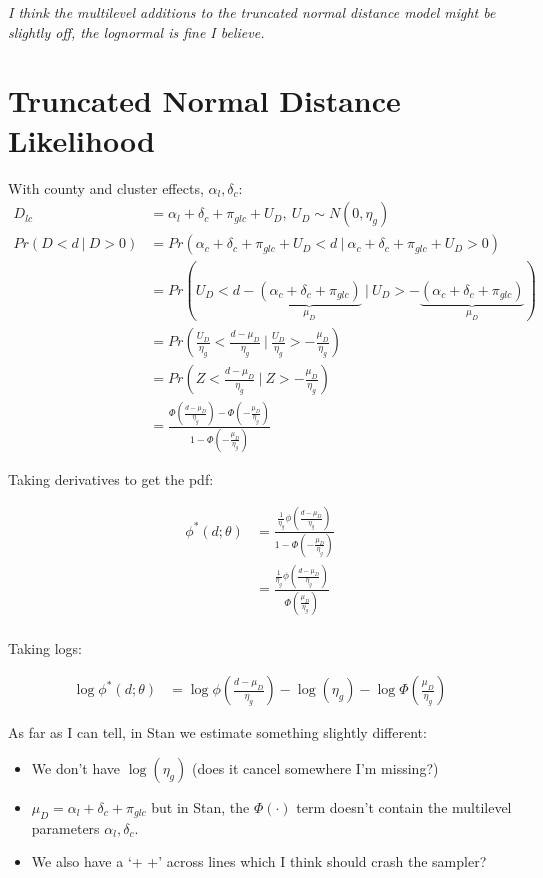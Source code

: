 \documentclass{article}
\begin{document}
    
\textit{I think the multilevel additions to the truncated normal distance model 
might be slightly off, 
the lognormal is fine I believe.}
\section*{Truncated Normal Distance Likelihood}

With county and cluster effects, $\alpha_l, \delta_c$:
\begin{align*}
  D_{lc} &= \alpha_l + \delta_c + \pi_{glc} + U_D, \ U_D \sim N(0, \eta_g) \\
  Pr(D < d \ |\  D > 0 ) &= Pr(\alpha_c + \delta_c + \pi_{glc} + U_D < d \ | \ 
  \alpha_c + \delta_c + \pi_{glc} + U_D > 0) \\
   &= Pr( U_D < d -  \underbrace{(\alpha_c + \delta_c + \pi_{glc})}_{\mu_D}\   |\  
    U_D > - \underbrace{(\alpha_c + \delta_c + \pi_{glc})}_{\mu_D}) \\ 
   &= Pr\left( \frac{U_D}{\eta_g} <  \frac{d - \mu_D}{\eta_g} \   |\  
    \frac{U_D}{\eta_g} > - \frac{\mu_D}{\eta_g}\right) \\  
    &= Pr(Z < \frac{d - \mu_D}{\eta_g} \ |\  Z > -\frac{\mu_D}{\eta_g} ) \\
    &= \frac{
      \Phi\left( \frac{d - \mu_D}{\eta_g}\right) - \Phi\left(
        -\frac{\mu_D}{\eta_g}
      \right)
    }{1 - \Phi\left(-\frac{\mu_D}{\eta_g}\right)}
\end{align*}

Taking derivatives to get the pdf:

\begin{align*}
  \phi^*(d; \theta) &= \frac{
    \frac{1}{\eta_g}\phi\left(\frac{d - \mu_D}{\eta_g}\right)
  }{1 - \Phi\left(-\frac{\mu_D}{\eta_g}\right)} \\ 
   &= \frac{
    \frac{1}{\eta_g}\phi\left(\frac{d - \mu_D}{\eta_g}\right)
  }{\Phi\left(\frac{\mu_D}{\eta_g}\right)} \\ 
\end{align*}


Taking logs:

\begin{align*}
  \log \phi^*(d;\theta) &= \log \phi\left(\frac{d - \mu_D}{\eta_g}\right) - 
  \log(\eta_g) - \log \Phi\left(\frac{\mu_D}{\eta_g}\right)
\end{align*}

As far as I can tell, in Stan we estimate something slightly different:

\begin{itemize}
  \item We don't have $\log(\eta_g)$ (does it cancel somewhere I'm missing?)
  \item $\mu_D = \alpha_l + \delta_c + \pi_{glc}$ but in Stan, the $\Phi(\cdot)$ 
   term doesn't contain the multilevel parameters $\alpha_l, \delta_c$.
   \item We also have a `+ +' across lines which I think should crash the sampler?
\end{itemize}
\end{document}
